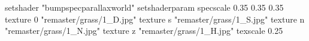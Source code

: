 setshader "bumpspecparallaxworld"
setshaderparam specscale 0.35 0.35 0.35
    texture 0 "remaster/grass/1_D.jpg"
    texture s "remaster/grass/1_S.jpg"
    texture n "remaster/grass/1_N.jpg"
    texture z "remaster/grass/1_H.jpg"
    texscale 0.25